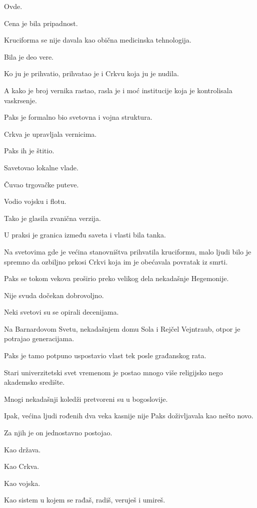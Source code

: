Ovde.

\bigskip

Cena je bila pripadnost.

Kruciforma se nije davala kao obična medicinska tehnologija.

Bila je deo vere.

Ko ju je prihvatio, prihvatao je i Crkvu koja ju je nudila.

A kako je broj vernika rastao, rasla je i moć institucije koja je kontrolisala vaskrsenje.

\bigskip

Paks je formalno bio svetovna i vojna struktura.

Crkva je upravljala vernicima.

Paks ih je štitio.

Savetovao lokalne vlade.

Čuvao trgovačke puteve.

Vodio vojsku i flotu.

Tako je glasila zvanična verzija.

U praksi je granica između saveta i vlasti bila tanka.

Na svetovima gde je većina stanovništva prihvatila kruciformu, malo ljudi bilo je spremno da ozbiljno prkosi Crkvi koja im je obećavala povratak iz smrti.

\bigskip

Paks se tokom vekova proširio preko velikog dela nekadašnje Hegemonije.

Nije svuda dočekan dobrovoljno.

Neki svetovi su se opirali decenijama.

Na Barnardovom Svetu, nekadašnjem domu Sola i Rejčel Vejntraub, otpor je potrajao generacijama.

Paks je tamo potpuno uspostavio vlast tek posle građanskog rata.

Stari univerzitetski svet vremenom je postao mnogo više religijsko nego akademsko središte.

Mnogi nekadašnji koledži pretvoreni su u bogoslovije.

\bigskip

Ipak, većina ljudi rođenih dva veka kasnije nije Paks doživljavala kao nešto novo.

Za njih je on jednostavno postojao.

Kao država.

Kao Crkva.

Kao vojska.

Kao sistem u kojem se rađaš, radiš, veruješ i umireš.

